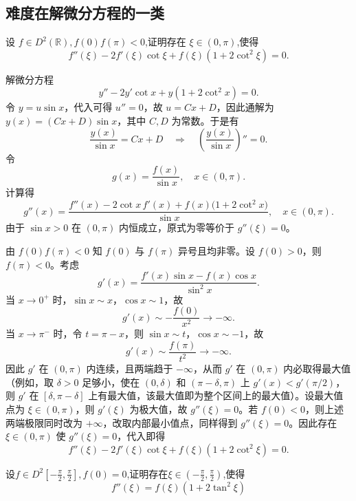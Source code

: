 \subsection{难度在解微分方程的一类}
\begin{example}[$f''\left(\xi\right)-2f'\left(\xi\right)\cot\xi+f\left(\xi\right)\left(1+2\cot^2\xi\right)=0$]
    设 $f\in D^2\left(\mathbb{R}\right),f\left(0\right)f\left(\pi\right)<0$,证明存在 $\xi\in(0,\pi)$,使得
$$f''\left(\xi\right)-2f'\left(\xi\right)\cot\xi+f\left(\xi\right)\left(1+2\cot^2\xi\right)=0.$$
\end{example}
\begin{solution}
解微分方程
\[
y'' - 2y'\cot x + y(1+2\cot^2 x)=0.
\]
令 $y = u\sin x$，代入可得 $u''=0$，故 $u = Cx + D$，因此通解为 $y(x) = (Cx + D)\sin x$，其中 $C,D$ 为常数。于是有
\[
\frac{y(x)}{\sin x}=Cx+D \quad\Rightarrow\quad \left(\frac{y(x)}{\sin x}\right)''=0.
\]
令
\[
g(x)=\frac{f(x)}{\sin x},\quad x\in(0,\pi).
\]
计算得
\[
g''(x)=\frac{f''(x)-2\cot x\,f'(x)+f(x)\bigl(1+2\cot^2 x\bigr)}{\sin x},\quad x\in(0,\pi).
\]
由于 $\sin x>0$ 在 $(0,\pi)$ 内恒成立，原式为零等价于 $g''(\xi)=0$。

由 $f(0)f(\pi)<0$ 知 $f(0)$ 与 $f(\pi)$ 异号且均非零。设 $f(0)>0$，则 $f(\pi)<0$。考虑
\[
g'(x)=\dfrac{f'(x)\sin x-f(x)\cos x}{\sin^2 x}.
\]
当 $x\to0^+$ 时，$\sin x\sim x$，$\cos x\sim 1$，故
\[
g'(x)\sim -\frac{f(0)}{x^2}\to -\infty.
\]
当 $x\to\pi^-$ 时，令 $t=\pi-x$，则 $\sin x\sim t$，$\cos x\sim -1$，故
\[
g'(x)\sim \frac{f(\pi)}{t^2}\to -\infty.
\]
因此 $g'$ 在 $(0,\pi)$ 内连续，且两端趋于 $-\infty$，从而 $g'$ 在 $(0,\pi)$ 内必取得最大值（例如，取 $\delta>0$ 足够小，使在 $(0,\delta)$ 和 $(\pi-\delta,\pi)$ 上 $g'(x)<g'(\pi/2)$，则 $g'$ 在 $[\delta,\pi-\delta]$ 上有最大值，该最大值即为整个区间上的最大值）。设最大值点为 $\xi\in(0,\pi)$，则 $g'(\xi)$ 为极大值，故 $g''(\xi)=0$。若 $f(0)<0$，则上述两端极限同时改为 $+\infty$，改取内部最小值点，同样得到 $g''(\xi)=0$。因此存在 $\xi\in(0,\pi)$ 使 $g''(\xi)=0$，代入即得
\[
f''(\xi)-2f'(\xi)\cot\xi+f(\xi)(1+2\cot^2\xi)=0.
\]
\end{solution}
\begin{example}[$f''\left(\xi\right)=f\left(\xi\right)\left(1+2\tan^{2}\xi\right)$]
    设$f\in D^2\left[-\frac\pi2,\frac\pi2\right],f\left(0\right)=0$,证明存在$\xi\in\left(-\frac\pi2,\frac\pi2\right)$,使得
$$f''\left(\xi\right)=f\left(\xi\right)\left(1+2\tan^{2}\xi\right)$$
\end{example}
